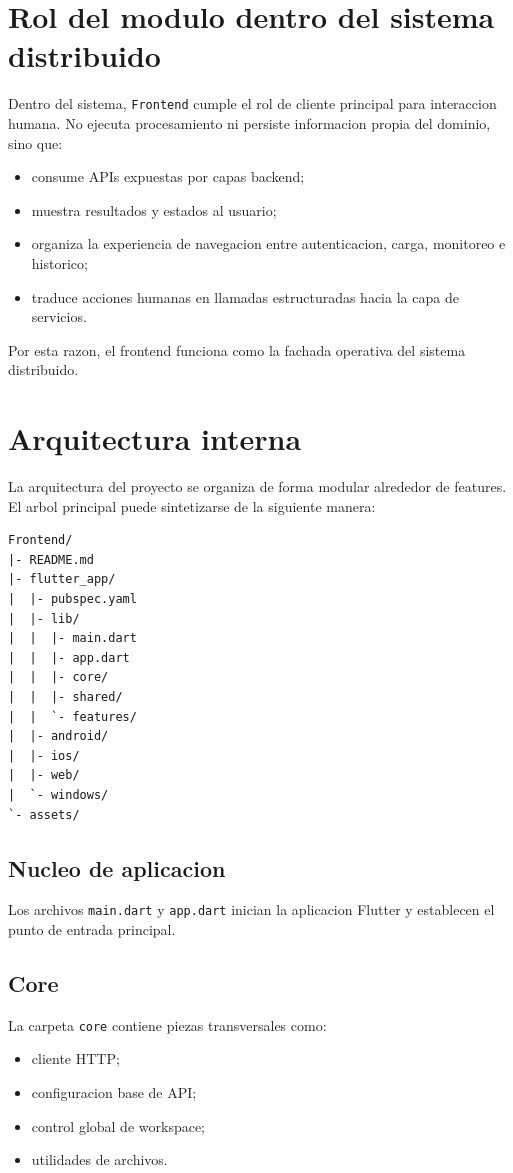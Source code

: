 \documentclass[conference]{IEEEtran}
\begin{document}
\section{Rol del modulo dentro del sistema distribuido}
Dentro del sistema, \texttt{Frontend} cumple el rol de cliente principal para interaccion humana. No ejecuta procesamiento ni persiste informacion propia del dominio, sino que:

\begin{itemize}[leftmargin=*]
\item consume APIs expuestas por capas backend;
\item muestra resultados y estados al usuario;
\item organiza la experiencia de navegacion entre autenticacion, carga, monitoreo e historico;
\item traduce acciones humanas en llamadas estructuradas hacia la capa de servicios.
\end{itemize}

Por esta razon, el frontend funciona como la fachada operativa del sistema distribuido.

\section{Arquitectura interna}
La arquitectura del proyecto se organiza de forma modular alrededor de features. El arbol principal puede sintetizarse de la siguiente manera:

\begin{lstlisting}
Frontend/
|- README.md
|- flutter_app/
|  |- pubspec.yaml
|  |- lib/
|  |  |- main.dart
|  |  |- app.dart
|  |  |- core/
|  |  |- shared/
|  |  `- features/
|  |- android/
|  |- ios/
|  |- web/
|  `- windows/
`- assets/
\end{lstlisting}

\subsection{Nucleo de aplicacion}
Los archivos \texttt{main.dart} y \texttt{app.dart} inician la aplicacion Flutter y establecen el punto de entrada principal.

\subsection{Core}
La carpeta \texttt{core} contiene piezas transversales como:
\begin{itemize}[leftmargin=*]
\item cliente HTTP;
\item configuracion base de API;
\item control global de workspace;
\item utilidades de archivos.
\end{itemize}
\end{document}
